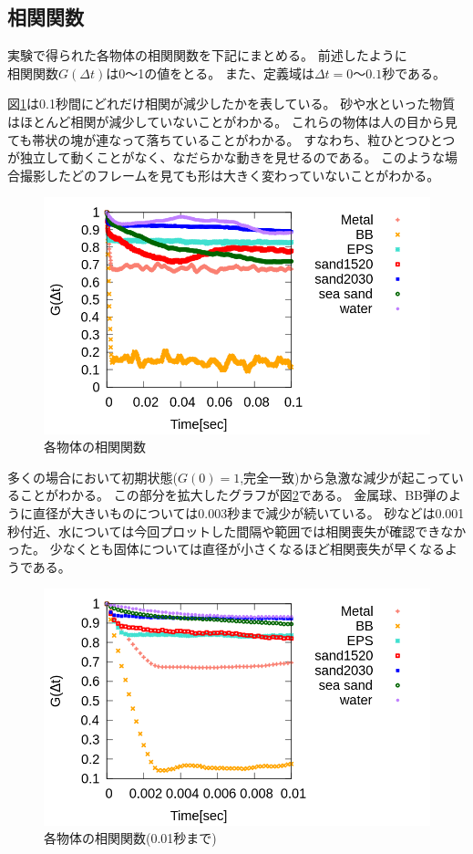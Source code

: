 \documentclass[a4paper,10pt,twocolumn,dvipdfmx]{jsarticle}
\begin{document}
\subsection{相関関数}
実験で得られた各物体の相関関数を下記にまとめる。
前述したように$相関関数G(\Delta t)$は0〜1の値をとる。
また、定義域は$\Delta t=0〜0.1秒$である。 \par
図\ref{fig:overall}は0.1秒間にどれだけ相関が減少したかを表している。
砂や水といった物質はほとんど相関が減少していないことがわかる。
これらの物体は人の目から見ても帯状の塊が連なって落ちていることがわかる。
すなわち、粒ひとつひとつが独立して動くことがなく、なだらかな動きを見せるのである。
このような場合撮影したどのフレームを見ても形は大きく変わっていないことがわかる。 \par
\begin{figure}[H]
	\includegraphics[scale=0.4]{overall.png}
	\caption{各物体の相関関数}
	\label{fig:overall}
\end{figure}
多くの場合において初期状態($G(0)=1$,完全一致)から急激な減少が起こっていることがわかる。
この部分を拡大したグラフが図\ref{fig:init}である。
金属球、BB弾のように直径が大きいものについては0.003秒まで減少が続いている。
砂などは0.001秒付近、水については今回プロットした間隔や範囲では相関喪失が確認できなかった。
少なくとも固体については直径が小さくなるほど相関喪失が早くなるようである。 \par
\begin{figure}[H]
	\includegraphics[scale=0.4]{init.png}
	\caption{各物体の相関関数(0.01秒まで)}
	\label{fig:init}
\end{figure}
\end{document}
